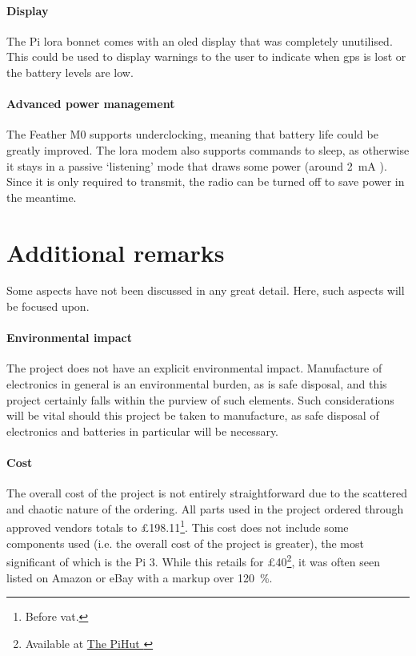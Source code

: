 \paragraph{Display}
The Pi \gls{lora} bonnet comes with an \acrshort{oled} display that
was completely unutilised. This could be used to display warnings to the user
to indicate when \acrshort{gps} is lost or the battery levels are low.

\paragraph{Advanced power management}
The Feather M0 supports underclocking, meaning that battery life
could be greatly improved. The \gls{lora} modem also supports commands
to sleep, as otherwise it stays in a passive `listening' mode that draws
some power (around \qty{2}{\mA} \cite{adafruit:loram0}).
Since it is only required to transmit, the radio can be
turned off to save power in the meantime.

\section{Additional remarks}
Some aspects have not been discussed in any great detail. 
Here, such aspects will be focused upon.

\paragraph{Environmental impact}
The project does not have an explicit environmental impact.
Manufacture of electronics in general is an environmental burden, 
as is safe disposal, and this project certainly falls within the purview
of such elements. Such considerations will be vital should this 
project be taken to manufacture, as safe disposal of electronics
and batteries in particular will be necessary. 

\paragraph{Cost} 
The overall cost of the project is not entirely straightforward 
due to the scattered and chaotic nature of the ordering.
All parts used in the project ordered through 
approved vendors totals to £198.11\footnote{
    Before \acrshort{vat}.
}. This cost does not include some components used (i.e. 
the overall cost of the project is greater), the most 
significant of which is the Pi 3. While this retails for 
£40\footnote{
    Available at 
    \href{https://thepihut.com/products/raspberry-pi-3-model-b?src=raspberrypi}{The PiHut \faExternalLink}
}, it was often seen listed on Amazon or eBay 
with a markup over \qty{120}{\%}.
